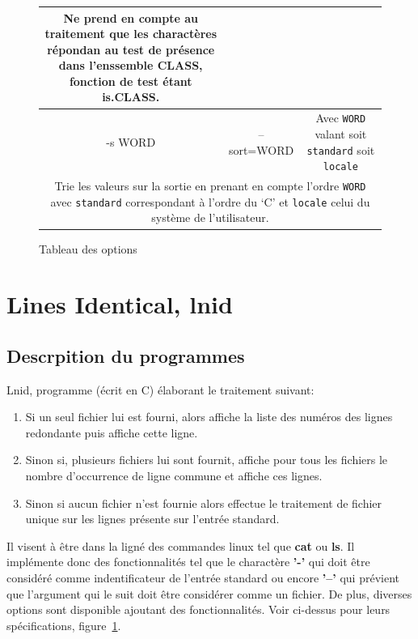 \documentclass[12pt]{article}
\begin{document}
\begin{figure}[H]
\begin{tabular}{|c|c|c|}
{                \parbox{15cm}{Ne prend en compte au traitement que les 
                charactères répondan au test  de présence dans l'enssemble 
                CLASS, fonction de test étant is.CLASS.}}\\[.8em]
            \hline
                \cellcolor{blue-s!25} -s WORD & \cellcolor{blue-s!25} 
                --sort=WORD & \cellcolor{blue-t!70}Avec \texttt{WORD} valant
                 soit \texttt{standard} soit \texttt{locale} \\
            \hline
                \multicolumn{3}{|c|}{\cellcolor{blue-u!7}\rule{0pt}{2em}
                \parbox{15cm}{{Trie les valeurs sur la sortie en prenant en 
                compte l'ordre \texttt{WORD} avec \texttt{standard}} 
                correspondant à l'ordre du  `C' et \texttt{locale} celui du 
                système de l'utilisateur.}}\\[1em]
            \hline
        \end{tabular}
        \captionsetup{position=bottom}
        \caption{Tableau des options}\label{table-opt}
    \end{figure}

    \newpage

    \section{Lines Identical, lnid}

    \subsection{Descrpition du programmes}

    Lnid, programme (écrit en C) élaborant le traitement suivant:
    \begin{enumerate}
        \item[] Si un seul fichier lui est fourni, alors affiche la liste 
        des numéros des lignes redondante puis affiche cette ligne.
        \item[] Sinon si, plusieurs fichiers lui sont fournit, affiche pour
         tous les fichiers le nombre d'occurrence de ligne commune et 
         affiche ces lignes.
        \item[] Sinon si aucun fichier n'est fournie alors effectue le 
        traitement de fichier unique sur les lignes présente sur l'entrée 
        standard.
    \end{enumerate}

    Il visent à être dans la ligné des commandes linux tel que \textbf{cat} ou 
    \textbf{ls}. Il implémente donc des fonctionnalités tel que le charactère 
    \textbf{'-'} qui doit être considéré comme indentificateur de l'entrée 
    standard ou encore \textbf{'--'} qui prévient que l'argument qui le suit 
    doit être considérer comme un fichier. De plus, diverses options sont 
    disponible ajoutant des fonctionnalités. Voir ci-dessus pour leurs 
    spécifications, figure~\ref{table-opt}.
\end{document}
